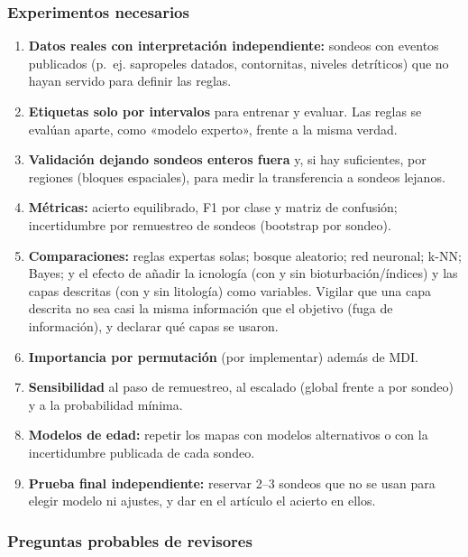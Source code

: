 \documentclass[
  10pt,
]{article}
\providecommand{\tightlist}{%
  \setlength{\itemsep}{0pt}\setlength{\parskip}{0pt}}
\begin{document}
\hypertarget{experimentos-necesarios-2}{%
\subsubsection{Experimentos
necesarios}\label{experimentos-necesarios-2}}

\begin{enumerate}
\def\labelenumi{\arabic{enumi}.}
\tightlist
\item
  \textbf{Datos reales con interpretación independiente:} sondeos con
  eventos publicados (p.~ej. sapropeles datados, contornitas, niveles
  detríticos) que no hayan servido para definir las reglas.
\item
  \textbf{Etiquetas solo por intervalos} para entrenar y evaluar. Las
  reglas se evalúan aparte, como «modelo experto», frente a la misma
  verdad.
\item
  \textbf{Validación dejando sondeos enteros fuera} y, si hay
  suficientes, por regiones (bloques espaciales), para medir la
  transferencia a sondeos lejanos.
\item
  \textbf{Métricas:} acierto equilibrado, F1 por clase y matriz de
  confusión; incertidumbre por remuestreo de sondeos (bootstrap por
  sondeo).
\item
  \textbf{Comparaciones:} reglas expertas solas; bosque aleatorio; red
  neuronal; k-NN; Bayes; y el efecto de añadir la icnología (con y sin
  bioturbación/índices) y las capas descritas (con y sin litología) como
  variables. Vigilar que una capa descrita no sea casi la misma
  información que el objetivo (fuga de información), y declarar qué
  capas se usaron.
\item
  \textbf{Importancia por permutación} (por implementar) además de MDI.
\item
  \textbf{Sensibilidad} al paso de remuestreo, al escalado (global
  frente a por sondeo) y a la probabilidad mínima.
\item
  \textbf{Modelos de edad:} repetir los mapas con modelos alternativos o
  con la incertidumbre publicada de cada sondeo.
\item
  \textbf{Prueba final independiente:} reservar 2--3 sondeos que no se
  usan para elegir modelo ni ajustes, y dar en el artículo el acierto en
  ellos.
\end{enumerate}

\hypertarget{preguntas-probables-de-revisores-2}{%
\subsubsection{Preguntas probables de
revisores}\label{preguntas-probables-de-revisores-2}}
\end{document}
